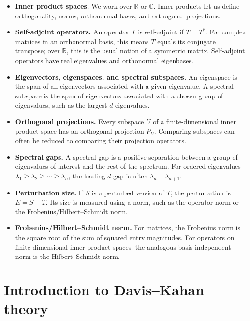\documentclass[11pt]{article}
\theoremstyle{remark}
\begin{document}
\begin{itemize}
\item \textbf{Inner product spaces.}
We work over $\mathbb R$ or $\mathbb C$.  Inner products let us define
orthogonality, norms, orthonormal bases, and orthogonal projections.

\item \textbf{Self-adjoint operators.}
An operator $T$ is self-adjoint if $T=T^*$.  For complex matrices in an
orthonormal basis, this means $T$ equals its conjugate transpose; over
$\mathbb R$, this is the usual notion of a symmetric matrix.  Self-adjoint
operators have real eigenvalues and orthonormal eigenbases.

\item \textbf{Eigenvectors, eigenspaces, and spectral subspaces.}
An eigenspace is the span of all eigenvectors associated with a given
eigenvalue.  A spectral subspace is the span of eigenvectors associated with a
chosen group of eigenvalues, such as the largest $d$ eigenvalues.

\item \textbf{Orthogonal projections.}
Every subspace $U$ of a finite-dimensional inner product space has an
orthogonal projection $P_U$.  Comparing subspaces can often be reduced to
comparing their projection operators.

\item \textbf{Spectral gaps.}
A spectral gap is a positive separation between a group of eigenvalues of
interest and the rest of the spectrum.  For ordered eigenvalues
$\lambda_1\geq\lambda_2\geq\cdots\geq\lambda_n$, the leading-$d$ gap is often
$\lambda_d-\lambda_{d+1}$.

\item \textbf{Perturbation size.}
If $S$ is a perturbed version of $T$, the perturbation is $E=S-T$.  Its size is
measured using a norm, such as the operator norm or the
Frobenius/Hilbert--Schmidt norm.

\item \textbf{Frobenius/Hilbert--Schmidt norm.}
For matrices, the Frobenius norm is the square root of the sum of squared
entry magnitudes.  For operators on finite-dimensional inner product spaces,
the analogous basis-independent norm is the Hilbert--Schmidt norm.
\end{itemize}


\section{Introduction to Davis--Kahan theory}
\end{document}
